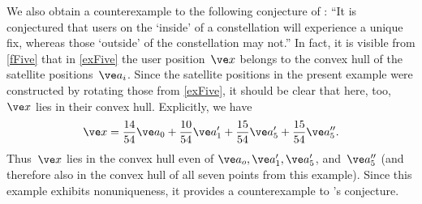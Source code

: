 \documentclass[reqno]{amsart}
\begin{document}
\begin{ex}
  We also obtain a counterexample to the following conjecture of : ``It is conjectured that users on the `inside'
of a constellation will experience a unique fix, whereas
those `outside' of the constellation may not.'' In fact, it is visible from \cref{fFive} that in \cref{exFive} the user position~$\ve x$ belongs to the convex hull of the satellite positions~$\ve a_i$. Since the satellite positions in the present example were constructed by rotating those from \cref{exFive}, it should be clear that here, too, $\ve x$ lies in their convex hull. Explicitly, we have
\[
  \ve x = \frac{14}{54} \ve a_0 + \frac{10}{54} \ve a_1' + \frac{15}{54} \ve a_5' + \frac{15}{54} \ve a_5''.
\]
Thus~$\ve x$ lies in the convex hull even of $\ve a_o,\ve a_1',\ve a_5'$, and~$\ve a_5''$ (and therefore also in the convex hull of all seven points from this example). Since this example exhibits nonuniqueness, it provides a counterexample to 's conjecture.
\end{ex}
\end{document}
